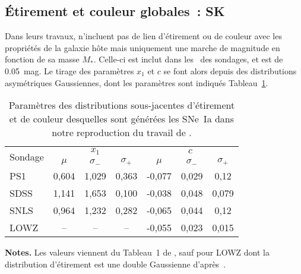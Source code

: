 \documentclass[../main/main.tex]{subfiles}
\begin{document}
\subsection{Étirement et couleur globales~: SK}\label{ssec:sk}

Dans leurs travaux,  n'incluent pas de lien d'étirement
ou de couleur avec les propriétés de la galaxie hôte mais uniquement une marche
de magnitude en fonction de sa masse $M_*$. Celle-ci est inclut dans les
\wgtmap\ des sondages, et est de \SI{0.05}{mag}. Le tirage des paramètres $x_1$
et $c$ se font alors depuis des distributions asymétriques Gaussiennes, dont les
paramètres sont indiqués Tableau~\ref{tab:skasym}.

\begin{table}[h]
    \centering
    \begin{threeparttable}
        \caption[Paramètres des distributions d'étirement et de couleur pour les
        simulations SK]{Paramètres des distributions sous-jacentes d'étirement
            et de couleur desquelles sont générées les SNe~Ia dans notre
        reproduction du travail de .}
        \label{tab:skasym}
        \begin{tabular}{lcccccc}
            \toprule
            \multirow{2}[2]{*}{Sondage} &
            \multicolumn{3}{c}{$x_1$} &
            \multicolumn{3}{c}{$c$}\\
            \cmidrule(lr){2-4} \cmidrule(lr){5-7} &
            $\mu$ & $\sigma_-$ & $\sigma_+$ &
            $\mu$ & $\sigma_-$ & $\sigma_+$ \\
            \midrule
            PS1    &
            0,604  & 1,029 & 0,363   &
            -0,077 & 0,029 & 0,12\\
            SDSS   &
            1,141  & 1,653 & 0,100   &
            -0,038 & 0,048 & 0,079\\
            SNLS   &
            0,964  & 1,232 & 0,282   &
            -0,065 & 0,044 & 0,12\\
            LOWZ   &
            --     & --    & --      &
            -0,055 & 0,023 & 0,015\\
            \bottomrule
        \end{tabular}
        \begin{tablenotes}[flushleft]
        \item\small \textbf{\hspace{-3,2pt}Notes.} Les valeurs viennent du
            Tableau~1 de , sauf pour LOWZ dont la
            distribution d'étirement est une double Gaussienne
            d'après~\cite{scolnic2018}.
        \end{tablenotes}
    \end{threeparttable}
\end{table}
\end{document}
